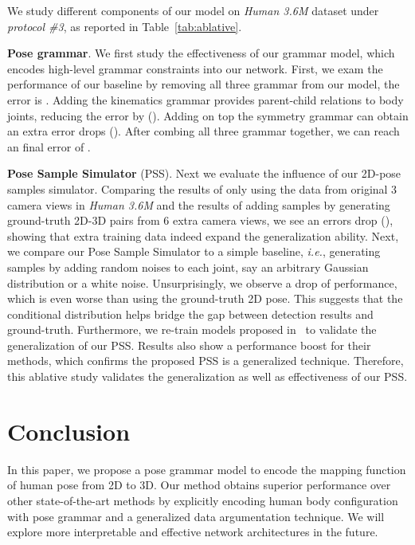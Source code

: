\documentclass[letterpaper]{article} \usepackage{aaai18}  \usepackage{times}  \usepackage{helvet}  \usepackage{courier}  \usepackage{url}  \usepackage{color}
\begin{document}
We study different components of our model on \textit{Human 3.6M} dataset under \textit{protocol \#3}, as reported in Table~\ref{tab:ablative}.

\textbf{Pose grammar}. We first study the effectiveness of our grammar model, which encodes high-level grammar constraints into our network. First, we exam the performance of our baseline by removing all three grammar from our model, the error is . Adding the kinematics grammar provides parent-child relations to body joints, reducing the error by  (). Adding on top the symmetry grammar can obtain an extra error drops (). After combing all three grammar together, we can reach an final error of .

\textbf{Pose Sample Simulator} (PSS). Next we evaluate the influence of our 2D-pose samples simulator. Comparing the results of only using the data from original 3 camera views in \textit{Human 3.6M} and the results of adding samples by generating ground-truth 2D-3D pairs from 6 extra camera views, we see an  errors drop (), showing that extra training data indeed expand the generalization ability. Next, we compare our Pose Sample Simulator to a simple baseline, \textit{i.e.}, generating samples by adding random noises to each joint, say an arbitrary Gaussian distribution or a white noise. Unsurprisingly, we observe a drop of performance, which is even worse than using the ground-truth 2D pose. This suggests that the conditional distribution  helps bridge the gap between detection results and ground-truth. Furthermore, we re-train models proposed in~\cite{Nie3DPoseCVPR17,martinez2017simple} to validate the generalization of our PSS. Results also show a performance boost for their methods, which confirms the proposed PSS is a generalized technique. Therefore, this ablative study validates the generalization as well as effectiveness of our PSS.

\section{Conclusion}

In this paper, we propose a pose grammar model to encode the mapping function of human pose from 2D to 3D. Our method obtains superior performance over other state-of-the-art methods by explicitly encoding human body configuration with pose grammar and a generalized data argumentation technique. We will explore more interpretable and effective network architectures in the future.

{
\small


}
\end{document}
